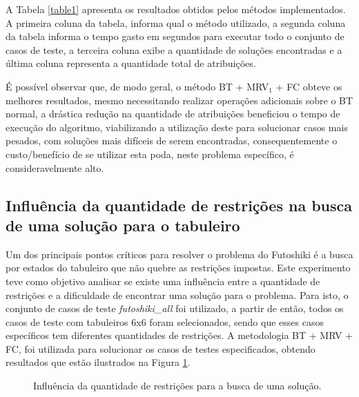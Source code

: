 \documentclass[9pt,technote,compsoc]{IEEEtran}
\begin{document}
A Tabela \ref{table1} apresenta os resultados obtidos pelos métodos implementados. A primeira coluna da tabela, informa qual o método utilizado, a segunda coluna da tabela informa o tempo gasto em segundos para executar todo o conjunto de casos de teste, a terceira coluna exibe a quantidade de soluções encontradas e a última coluna representa a quantidade total de atribuições.

É possível observar que, de modo geral, o método BT + MRV$_{1}$ + FC obteve os melhores resultados, mesmo necessitando realizar operações adicionais sobre o BT normal, a drástica redução na quantidade de atribuições beneficiou o tempo de execução do algoritmo, viabilizando a utilização deste para solucionar casos mais pesados, com soluções mais difíceis de serem encontradas, consequentemente o custo/benefício de se utilizar esta poda, neste problema específico, é consideravelmente alto.
\subsection{Influência da quantidade de restrições na busca de uma solução para o tabuleiro}

Um dos principais pontos críticos para resolver o problema do Futoshiki é a busca por estados do tabuleiro que não quebre as restrições impostas. Este experimento teve como objetivo analisar se existe uma influência entre a quantidade de restrições e a dificuldade de encontrar uma solução para o problema. Para isto, o conjunto de casos de teste \textit{futoshiki\_all} foi utilizado, a partir de então, todos os casos de teste com tabuleiros 6x6 foram selecionados, sendo que esses casos específicos tem diferentes quantidades de restrições. A metodologia BT + MRV + FC, foi utilizada para solucionar os casos de testes especificados, obtendo resultados que estão ilustrados na Figura \ref{constraints}.

\begin{figure}[H]
\caption{Influência da quantidade de restrições para a busca de uma solução.}
\label{constraints}
\end{figure}
\end{document}
